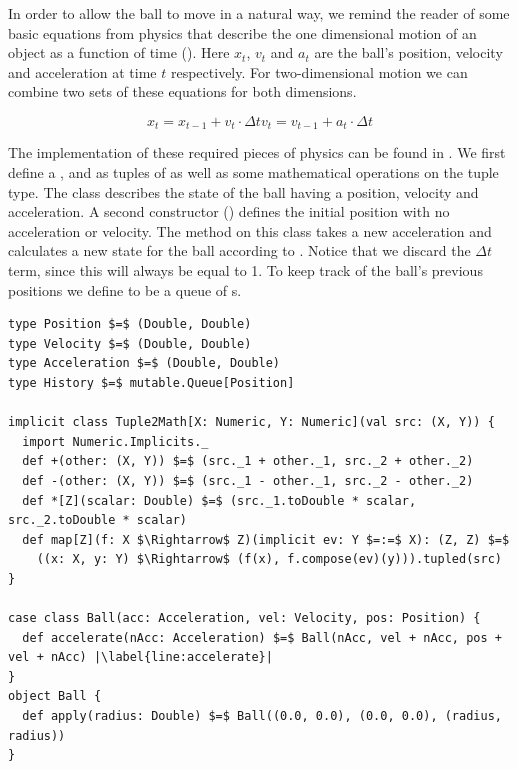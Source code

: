 In order to allow the ball to move in a natural way, we remind the reader of some basic equations from physics that describe the one dimensional motion of an object as a function of time (). Here $x_t$, $v_t$ and $a_t$ are the ball's position, velocity and acceleration at time $t$ respectively. For two-dimensional motion we can combine two sets of these equations for both dimensions.

\begin{subequations}
	\begin{equation}
		x_t = x_{t - 1} + v_t \cdot \Delta t
	\end{equation}
	\begin{equation}
		v_t = v_{t - 1} + a_t \cdot \Delta t
	\end{equation}
	\label{eq:motion}
\end{subequations}

The implementation of these required pieces of physics can be found in . We first define a ,  and  as tuples of  as well as some mathematical operations on the tuple type. The  class describes the state of the ball having a position, velocity and acceleration. A second constructor () defines the initial position with no acceleration or velocity. The method  on this class takes a new acceleration and calculates a new state for the ball according to . Notice that we discard the $\Delta t$ term, since this will always be equal to 1. To keep track of the ball's previous positions we define  to be a queue of s.

\begin{minipage}{\linewidth}
\begin{lstlisting}[style=ScalaStyle, caption={Ball motion physics}, label={lst:ball-physics}]
type Position $=$ (Double, Double)
type Velocity $=$ (Double, Double)
type Acceleration $=$ (Double, Double)
type History $=$ mutable.Queue[Position]

implicit class Tuple2Math[X: Numeric, Y: Numeric](val src: (X, Y)) {
  import Numeric.Implicits._
  def +(other: (X, Y)) $=$ (src._1 + other._1, src._2 + other._2)
  def -(other: (X, Y)) $=$ (src._1 - other._1, src._2 - other._2)
  def *[Z](scalar: Double) $=$ (src._1.toDouble * scalar, src._2.toDouble * scalar)
  def map[Z](f: X $\Rightarrow$ Z)(implicit ev: Y $=:=$ X): (Z, Z) $=$
    ((x: X, y: Y) $\Rightarrow$ (f(x), f.compose(ev)(y))).tupled(src)
}

case class Ball(acc: Acceleration, vel: Velocity, pos: Position) {
  def accelerate(nAcc: Acceleration) $=$ Ball(nAcc, vel + nAcc, pos + vel + nAcc) |\label{line:accelerate}|
}
object Ball {
  def apply(radius: Double) $=$ Ball((0.0, 0.0), (0.0, 0.0), (radius, radius))
}
\end{lstlisting}
\end{minipage}

